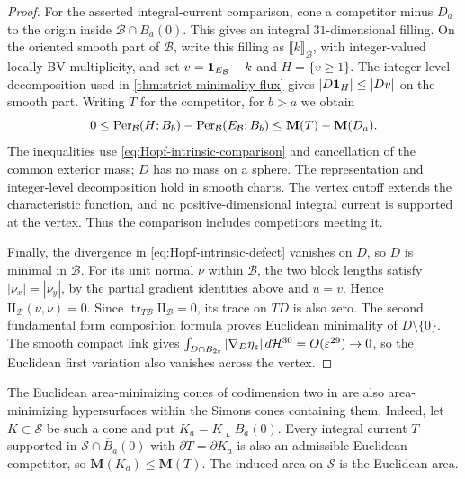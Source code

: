 \begin{proof}
For the asserted integral-current comparison, cone a competitor
minus \(D_a\) to the origin inside \(\mathcal B\cap\overline B_a(0)\).
This gives an integral \(31\)-dimensional filling. On the oriented smooth part of \(\mathcal B\), write this filling as
\(\llbracket k\rrbracket_{\mathcal B}\), with integer-valued
locally BV multiplicity, and set
\(v=\mathbf 1_{E_{\mathcal B}}+k\) and \(H=\{v\geq1\}\).
The integer-level decomposition used in
\cref{thm:strict-minimality-flux} gives
\(\lvert D\mathbf 1_H\rvert\leq|Dv|\) on the smooth part.
Writing \(T\) for the competitor, for \(b>a\) we obtain
\[
 0\leq \operatorname{Per}_{\mathcal B}(H;B_b)-
          \operatorname{Per}_{\mathcal B}(E_{\mathcal B};B_b)
 \leq \mathbf M(T)-\mathbf M(D_a).
\]
The inequalities use \eqref{eq:Hopf-intrinsic-comparison} and
cancellation of the common exterior mass; $D$ has no mass on a sphere.
The representation and integer-level decomposition hold in smooth
charts. The vertex cutoff extends the characteristic function,
and no positive-dimensional integral current is supported at the
vertex. Thus the comparison includes competitors meeting it.

Finally, the divergence in \eqref{eq:Hopf-intrinsic-defect} vanishes
on \(D\), so \(D\) is minimal in \(\mathcal B\).
For its unit normal \(\nu\) within \(\mathcal B\), the two block
lengths satisfy \(|\nu_x|=|\nu_y|\), by the partial gradient
identities above and \(u=v\). Hence
\(\mathrm{II}_{\mathcal B}(\nu,\nu)=0\). Since
\(\operatorname{tr}_{T\mathcal B}\mathrm{II}_{\mathcal B}=0\),
its trace on \(TD\) is also zero. The second fundamental form
composition formula proves Euclidean minimality of \(D\setminus\{0\}\).
The smooth compact link gives
\(\int_{D\cap B_{2\varepsilon}}|\nabla_D\eta_\varepsilon|\,d\mathcal H^{30}
=O(\varepsilon^{29})\to0\), so the Euclidean first variation also vanishes
across the vertex.
\end{proof}

The Euclidean area-minimizing cones of codimension two in
\cite[Theorem~B]{CuiFKM25} are also area-minimizing hypersurfaces within
the Simons cones containing them. Indeed, let \(K\subset\mathcal S\)
be such a cone and put \(K_a=K\mathbin{\llcorner}B_a(0)\).
Every integral current \(T\) supported in
\(\mathcal S\cap\overline B_a(0)\) with
\(\partial T=\partial K_a\) is also an admissible Euclidean
competitor, so \(\mathbf M(K_a)\leq\mathbf M(T)\).
The induced area on \(\mathcal S\) is the Euclidean area.

